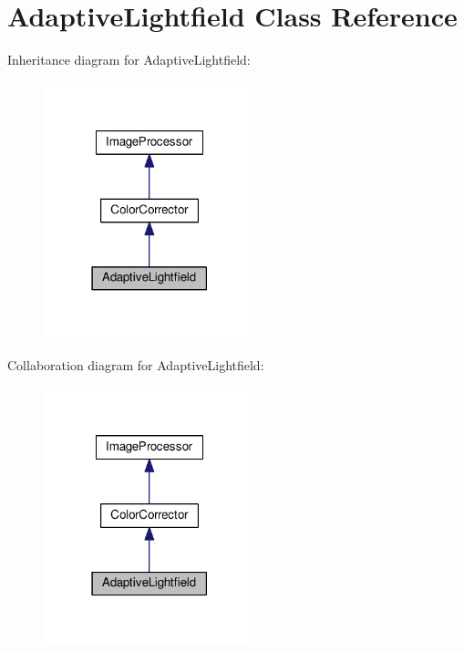 \hypertarget{classAdaptiveLightfield}{}\section{Adaptive\+Lightfield Class Reference}
\label{classAdaptiveLightfield}


Inheritance diagram for Adaptive\+Lightfield\+:\nopagebreak
\begin{figure}[H]
\begin{center}
\leavevmode
\includegraphics[width=174pt]{classAdaptiveLightfield__inherit__graph}
\end{center}
\end{figure}


Collaboration diagram for Adaptive\+Lightfield\+:\nopagebreak
\begin{figure}[H]
\begin{center}
\leavevmode
\includegraphics[width=174pt]{classAdaptiveLightfield__coll__graph}
\end{center}
\end{figure}
